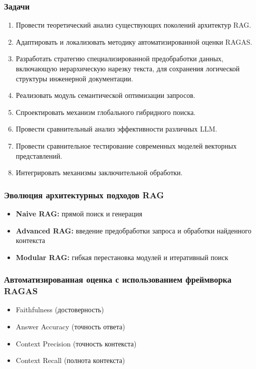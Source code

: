 \documentclass[aspectratio=169, xcolor=table]{beamer} %
\begin{document}
\begin{frame}
\frametitle{Задачи}
\small
\begin{enumerate}
    \item Провести теоретический анализ существующих поколений архитектур RAG.
    \item Адаптировать и локализовать методику автоматизированной оценки RAGAS.
    \item Разработать стратегию специализированной предобработки данных, включающую иерархическую нарезку текста, для сохранения логической структуры инженерной документации.
    \item Реализовать модуль семантической оптимизации запросов.
    \item Спроектировать механизм глобального гибридного поиска.
    \item Провести сравнительный анализ эффективности различных LLM.
    \item Провести сравнительное тестирование современных моделей векторных представлений.
    \item Интегрировать механизмы заключительной обработки.
\end{enumerate}
\end{frame}

\begin{frame}
\frametitle{Эволюция архитектурных подходов RAG}
\begin{itemize}
    \item \textbf{Naive RAG:} прямой поиск и генерация
    \item \textbf{Advanced RAG:} введение предобработки запроса и обработки найденного контекста
    \item \textbf{Modular RAG:} гибкая перестановка модулей и итеративный поиск
\end{itemize}
\end{frame}

\begin{frame}
\frametitle{Автоматизированная оценка с использованием фреймворка RAGAS}
\begin{itemize}
    \item Faithfulness (достоверность)
    \item Answer Accuracy (точность ответа)
    \item Context Precision (точность контекста)
    \item Context Recall (полнота контекста)
\end{itemize}
\end{frame}
\end{document}
